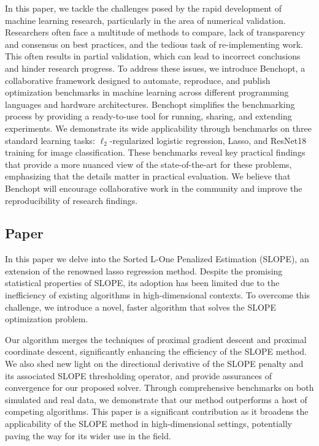 In this paper, we tackle the challenges posed by the rapid development of machine learning research, particularly in the area of numerical validation. Researchers often face a multitude of methods to compare, lack of transparency and consensus on best practices, and the tedious task of re-implementing work. This often results in partial validation, which can lead to incorrect conclusions and hinder research progress. To address these issues, we introduce Benchopt, a collaborative framework designed to automate, reproduce, and publish optimization benchmarks in machine learning across different programming languages and hardware architectures. Benchopt simplifies the benchmarking process by providing a ready-to-use tool for running, sharing, and extending experiments. We demonstrate its wide applicability through benchmarks on three standard learning tasks: $\ell_2$-regularized logistic regression, Lasso, and ResNet18 training for image classification. These benchmarks reveal key practical findings that provide a more nuanced view of the state-of-the-art for these problems, emphasizing that the details matter in practical evaluation. We believe that Benchopt will encourage collaborative work in the community and improve the reproducibility of research findings.

\subsection{Paper \V}

In this paper we delve into the Sorted L-One Penalized Estimation (SLOPE), an extension of the renowned lasso regression method. Despite the promising statistical properties of SLOPE, its adoption has been limited due to the inefficiency of existing algorithms in high-dimensional contexts. To overcome this challenge, we introduce a novel, faster algorithm that solves the SLOPE optimization problem.

Our algorithm merges the techniques of proximal gradient descent and proximal coordinate descent, significantly enhancing the efficiency of the SLOPE method. We also shed new light on the directional derivative of the SLOPE penalty and its associated SLOPE thresholding operator, and provide assurances of convergence for our proposed solver. Through comprehensive benchmarks on both simulated and real data, we demonstrate that our method outperforms a host of competing algorithms. This paper is a significant contribution as it broadens the applicability of the SLOPE method in high-dimensional settings, potentially paving the way for its wider use in the field.

